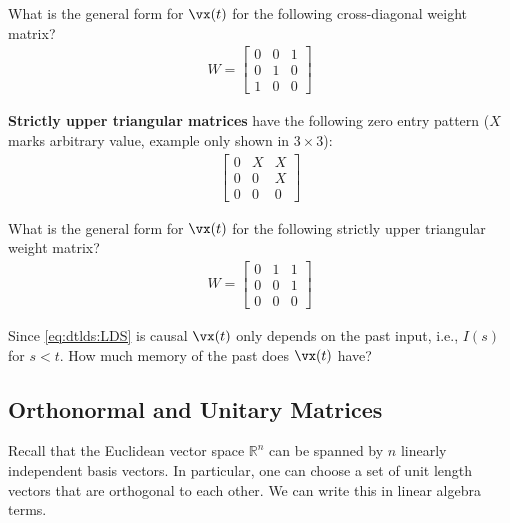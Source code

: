 \documentclass[a4paper,11pt]{exam}
\newcounter{ct}
\newcommand{\field}[1]{\ensuremath{\mathbb{#1}}}
\newcommand{\reals}{\field{R}}
\begin{document}
\begin{questions}
\question What is the general form for $\vx(t)$ for the following cross-diagonal weight matrix?
\begin{align}\label{eq:LA:cdiag:eg}
    W
    =
    \begin{bmatrix}
	0 & 0 & 1 \\
	0 & 1 & 0\\
	1 & 0 & 0
    \end{bmatrix}
\end{align}

\clearpage
\textbf{Strictly upper triangular matrices} have the following zero entry pattern ($X$ marks arbitrary value, example only shown in $3 \times 3$):
\begin{align}\label{eq:LA:suppertri}
    \begin{bmatrix}
	0 & X & X \\
	0 & 0 & X\\
	0 & 0 & 0
    \end{bmatrix}
\end{align}

\question What is the general form for $\vx(t)$ for the following strictly upper triangular weight matrix?
\begin{align}\label{eq:LA:suppertri:eg}
    W
    =
    \begin{bmatrix}
	0 & 1 & 1 \\
	0 & 0 & 1\\
	0 & 0 & 0
    \end{bmatrix}
\end{align}

\question Since \eqref{eq:dtlds:LDS} is causal $\vx(t)$ only depends on the past input, i.e., $I(s)$ for $s < t$.
How much memory of the past does $\vx(t)$ have?

\subsection{Orthonormal and Unitary Matrices}
Recall that the Euclidean vector space $\reals^n$ can be spanned by $n$ linearly independent basis vectors.
In particular, one can choose a set of unit length vectors that are orthogonal to each other.
We can write this in linear algebra terms.


\end{questions}
\end{document}
